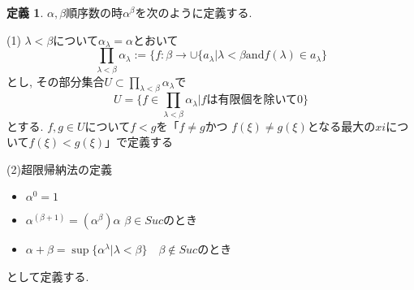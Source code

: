 \documentclass[dvipdfmx,a4paper,11pt]{article}
\theoremstyle{definition}
\newtheorem{dfn}[thm]{定義}
\begin{document}
 \begin{tcolorbox}
 [colback = white, colframe = green!35!black, fonttitle = \bfseries,breakable = true]
\begin{dfn}
$\alpha, \beta$順序数の時$\alpha^{\beta}$を次のように定義する. 

(1)
$\lambda < \beta$について$\alpha_{\lambda}=\alpha$とおいて
$$
\prod_{\lambda <\beta}\alpha_{\lambda}
:=
\{ f : \beta \to \cup\{ a_{\lambda}
|\lambda < \beta \text{and} f(\lambda) \in a_{\lambda}
\}
$$
とし, その部分集合$U \subset \prod_{\lambda <\beta}\alpha_{\lambda}$で
$$
U
=
\{ f \in \prod_{\lambda <\beta}\alpha_{\lambda} | \text{$f$は有限個を除いて0}\}
$$
とする.
$f,g \in U$について$f < g$を「$f \neq g$かつ
$f(\xi) \neq g(\xi)$となる最大の$xi$について$f(\xi) < g(\xi)$」で定義する


(2)超限帰納法の定義
\begin{itemize}
\item $\alpha^0 = 1$
\item $\alpha^(\beta+1) = (\alpha^\beta)\alpha$ $\beta \in Suc$のとき
\item $\alpha + \beta = \sup\{ \alpha^\lambda | \lambda<\beta\}$　$\beta \not \in Suc$のとき
\end{itemize}
\end{dfn}
として定義する. 
\end{tcolorbox}
\end{document}
